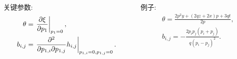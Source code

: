 \begin{frame}
\begin{columns}
\begin{column}{0.5\textwidth}
关键参数:
\[
\begin{aligned}
    \theta &= \left.{\frac{\partial \xi}{\partial p_1}}\right|_{p_1=0}, \\
    b_{i,j}&= \left.{\frac{\partial^2}{\partial p_{1,i}\partial p_{1,j}}h_{i,j}}\right|_{p_{1,i}=0,p_{1,j}=0}.
\end{aligned}
\]
\end{column}
\begin{column}{0.5\textwidth}
例子:
\[
\begin{aligned}
    &\theta=\frac{2p^2y+(2qz+2x)p+3qt}{2p}, \\ 
    &b_{i,j}=-\frac{2p_ip_j(p_i+p_j)}{q(p_i-p_j)^2}.
\end{aligned}
\]
\end{column}
\end{columns}
\begin{figure}
\setcounter{subfigure}{0}
\centering 
{}
\end{figure}
\end{frame}

